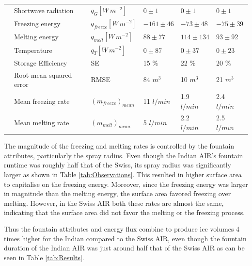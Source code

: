 \documentclass[utf8]{frontiersSCNS} %
\begin{document}
\begin{table}
\begin{tabular}{@{}|llllll|@{}}
		\multicolumn{1}{|l|}{} & Shortwave radiation     & $q_{G} [W\,m^{-2}]  $     & $0 \pm 1$     & $0 \pm 1$     & $0 \pm 1$     \\
		\multicolumn{1}{|l|}{} & Freezing energy         & $q_{freeze} [W\,m^{-2}] $ & $-161\pm 46$  & $-73 \pm 48$  & $-75\pm 39$   \\
		\multicolumn{1}{|l|}{} & Melting energy          & $q_{melt} [W\,m^{-2}] $   & $88 \pm 77$   & $114\pm 134$  & $93 \pm 92$   \\
		\multicolumn{1}{|l|}{} & Temperature             & $q_{T} [W\,m^{-2}] $      & $0 \pm 87$    & $0 \pm 37$    & $0 \pm 23$    \\\midrule
		\multicolumn{1}{|l|}{\multirow{3}{*}{\rotatebox[origin=c]{90}{Charecteristics}}}
		                       & Storage Efficiency      & SE                        & 15 \%         & 22 \%         & 20 \%         \\
		\multicolumn{1}{|l|}{} & Root mean squared error & RMSE                      & 84 $m^{3}$    & 10 $m^{3}$    & 21 $m^{3}$    \\
		\multicolumn{1}{|l|}{} & Mean freezing rate      & $(m_{freeze})_{mean}$     & 11 $l/min$    & 1.9 $l/min$   & 2.4 $l/min$   \\
		\multicolumn{1}{|l|}{} & Mean melting rate       & $(m_{melt})_{mean}$       & 5 $l/min$     & 2.2 $l/min$   & 2.5 $l/min$   \\\bottomrule
	\end{tabular}
\end{table}

The magnitude of the freezing and melting rates is controlled by the fountain attributes, particularly the spray radius.
Even though the Indian AIR's fountain runtime was roughly half that of the Swiss, its spray radius was significantly
larger as shown in Table \ref{tab:Observations}. This resulted in higher surface area to capitalise on the freezing energy. Moreover, since the freezing energy was larger in magnitude than the melting energy, the surface area favored freezing over melting. However, in the Swiss AIR both these rates are almost the same, indicating that the surface area did not favor the melting or the freezing process.

Thus the fountain attributes and energy flux combine to produce ice volumes 4 times higher for the Indian compared to the Swiss AIR, even though the fountain duration of the Indian AIR was just around half that of the Swiss AIR as can be seen in Table \ref{tab:Results}.
\end{document}
